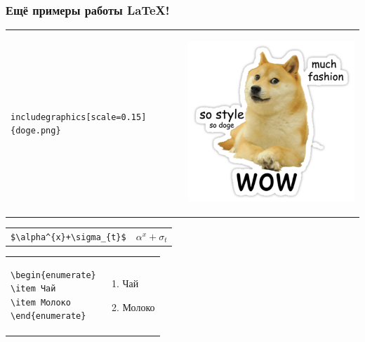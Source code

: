 \documentclass[newPxFont]{beamer}
\begin{document}
\begin{frame}[fragile]
\frametitle{Ещё примеры работы \LaTeX{}!} 

\begin{tabular}{p{5.5cm}p{4cm}}
\vspace{10mm} \verb|includegraphics[scale=0.15]{doge.png}| &  \begin{center} \includegraphics[scale=0.15]{doge.png} \end{center}
\end{tabular}
\begin{tabular}{p{5.5cm}p{4cm}}
\centering \verb|$\alpha^{x}+\sigma_{t}$| & \centering  $\alpha^{x}+\sigma_{t}$
\end{tabular}
\begin{tabular}{p{6.5cm}p{4cm}}
\begin{verbatim}
\begin{enumerate}
\item Чай
\item Молоко
\end{enumerate}
\end{verbatim} 
& \vspace{6mm} \begin{center}
\begin{enumerate}
	\item Чай
	\item Молоко
\end{enumerate}	 
\end{center} 
\end{tabular}
\end{frame}
\end{document}
